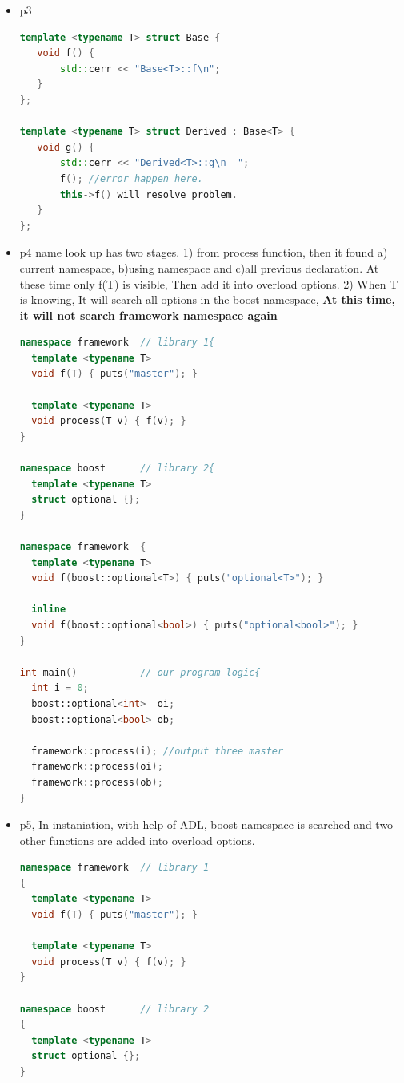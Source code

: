 \documentclass[a4paper,12pt,twoside]{book}
\begin{document}
\begin{itemize}
\item p3
\begin{lstlisting}[frame=single, language=c++]
template <typename T> struct Base {
   void f() {
       std::cerr << "Base<T>::f\n";
   }
};

template <typename T> struct Derived : Base<T> {
   void g() {
       std::cerr << "Derived<T>::g\n  ";
       f(); //error happen here. 
       this->f() will resolve problem.
   }
};
\end{lstlisting}


\item p4 name look up has two stages. 1) from process function, then it found a) current namespace, b)using namespace and c)all previous declaration.  At these time only f(T) is visible, Then add it into overload options.  2) When T is knowing, It will search all options in the boost namespace, \textbf{At this time, it will not search framework namespace again}
\begin{lstlisting}[frame=single, language=c++]
namespace framework  // library 1{
  template <typename T>
  void f(T) { puts("master"); }
 
  template <typename T>
  void process(T v) { f(v); } 
}
 
namespace boost      // library 2{
  template <typename T>
  struct optional {};
}
 
namespace framework  {     
  template <typename T>
  void f(boost::optional<T>) { puts("optional<T>"); }
    
  inline
  void f(boost::optional<bool>) { puts("optional<bool>"); }
}
 
int main()           // our program logic{
  int i = 0;
  boost::optional<int>  oi;
  boost::optional<bool> ob;
  
  framework::process(i); //output three master
  framework::process(oi);
  framework::process(ob);
}
\end{lstlisting}


\item p5, In instaniation, with help of ADL, boost namespace is searched and two other functions are added into overload options.

\begin{lstlisting}[frame=single, language=c++]
namespace framework  // library 1
{
  template <typename T>
  void f(T) { puts("master"); }
 
  template <typename T>
  void process(T v) { f(v); } 
}
 
namespace boost      // library 2
{
  template <typename T>
  struct optional {};
}
 

\end{lstlisting}
\end{itemize}
\end{document}
